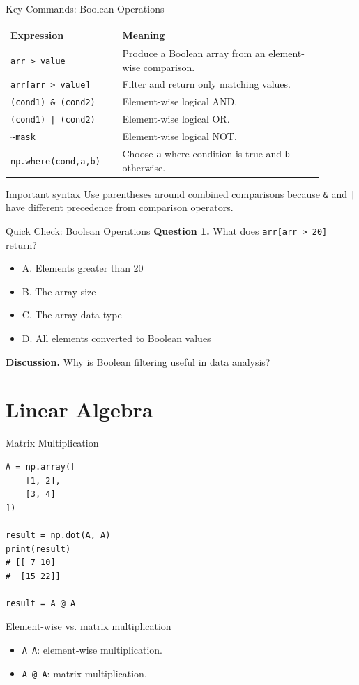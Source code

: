\documentclass[aspectratio=169,11pt]{beamer}
\newcommand{\quiztitle}[1]{\textbf{\textcolor{QuizOrange}{#1}}}
\begin{document}
\begin{frame}{Key Commands: Boolean Operations}
\small
\begin{tabular}{p{0.31\linewidth}p{0.58\linewidth}}
\toprule
\textbf{Expression} & \textbf{Meaning} \\
\midrule
\texttt{arr > value} & Produce a Boolean array from an element-wise comparison. \\
\texttt{arr[arr > value]} & Filter and return only matching values. \\
\texttt{(cond1) \& (cond2)} & Element-wise logical AND. \\
\texttt{(cond1) | (cond2)} & Element-wise logical OR. \\
\texttt{\textasciitilde mask} & Element-wise logical NOT. \\
\texttt{np.where(cond,a,b)} & Choose \texttt{a} where condition is true and \texttt{b} otherwise. \\
\bottomrule
\end{tabular}
\begin{block}{Important syntax}
Use parentheses around combined comparisons because \texttt{\&} and \texttt{|} have different precedence from comparison operators.
\end{block}
\end{frame}

\begin{frame}{Quick Check: Boolean Operations}
\small
\quiztitle{Question 1.} What does \texttt{arr[arr > 20]} return?
\begin{itemize}
  \item A. Elements greater than 20
  \item B. The array size
  \item C. The array data type
  \item D. All elements converted to Boolean values
\end{itemize}
\vspace{0.8em}
\quiztitle{Discussion.} Why is Boolean filtering useful in data analysis?
\end{frame}

\section{Linear Algebra}

\begin{frame}[fragile]{Matrix Multiplication}
\small
\begin{lstlisting}[style=py]
A = np.array([
    [1, 2],
    [3, 4]
])

result = np.dot(A, A)
print(result)
# [[ 7 10]
#  [15 22]]

result = A @ A
\end{lstlisting}
\begin{block}{Element-wise vs. matrix multiplication}
\begin{itemize}
  \item \texttt{A \* A}: element-wise multiplication.
  \item \texttt{A @ A}: matrix multiplication.
\end{itemize}
\end{block}
\end{frame}
\end{document}
